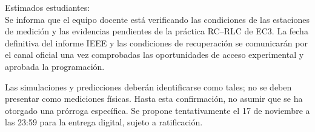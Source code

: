 \documentclass[11pt, a4paper]{article}
\begin{document}
\vspace{0.2cm}
\begin{tcolorbox}[colback=gray!5, colframe=black, title=\textbf{Mensaje de Actualización EC3 (Sujeto a Ratificación)}]
Estimados estudiantes: \\
Se informa que el equipo docente está verificando las condiciones de las estaciones de medición y las evidencias pendientes de la práctica RC–RLC de EC3. La fecha definitiva del informe IEEE y las condiciones de recuperación se comunicarán por el canal oficial una vez comprobadas las oportunidades de acceso experimental y aprobada la programación. 

Las simulaciones y predicciones deberán identificarse como tales; no se deben presentar como mediciones físicas. Hasta esta confirmación, no asumir que se ha otorgado una prórroga específica. Se propone tentativamente el 17 de noviembre a las 23:59 para la entrega digital, sujeto a ratificación.
\end{tcolorbox}
\end{document}

